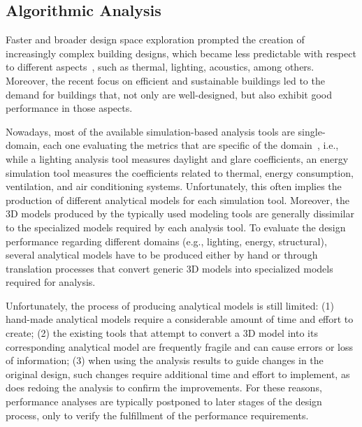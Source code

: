 \subsection{Algorithmic Analysis}
\label{ssec:aa}

Faster and broader design space exploration prompted the creation of increasingly complex building designs, which became less predictable with respect to different aspects~\cite{Branco2017AD}, such as thermal, lighting, acoustics, among others. Moreover, the recent focus on efficient and sustainable buildings led to the demand for buildings that, not only are well-designed, but also exhibit good performance in those aspects.
	
Nowadays, most of the available simulation-based analysis tools are single-domain, each one evaluating the metrics that are specific of the domain~\cite{Malkawi2005}, i.e., while a lighting analysis tool measures daylight and glare coefficients, an energy simulation tool measures the coefficients related to thermal, energy consumption, ventilation, and air conditioning systems. Unfortunately, this often implies the production of different analytical models for each simulation tool. Moreover, the 3D models produced by the typically used modeling tools are generally dissimilar to the specialized models required by each analysis tool. To evaluate the design performance regarding different domains (e.g., lighting, energy, structural), several analytical models have to be produced either by hand or through translation processes that convert generic 3D models into specialized models required for analysis.

Unfortunately, the process of producing analytical models is still limited: (1) hand-made analytical models require a considerable amount of time and effort to create; (2) the existing tools that attempt to convert a 3D model into its corresponding analytical model are frequently fragile and can cause errors or loss of information; (3) when using the analysis results to guide changes in the original design, such changes require additional time and effort to implement, as does redoing the analysis to confirm the improvements. For these reasons, performance analyses are typically postponed to later stages of the design process, only to verify the fulfillment of the performance requirements.


